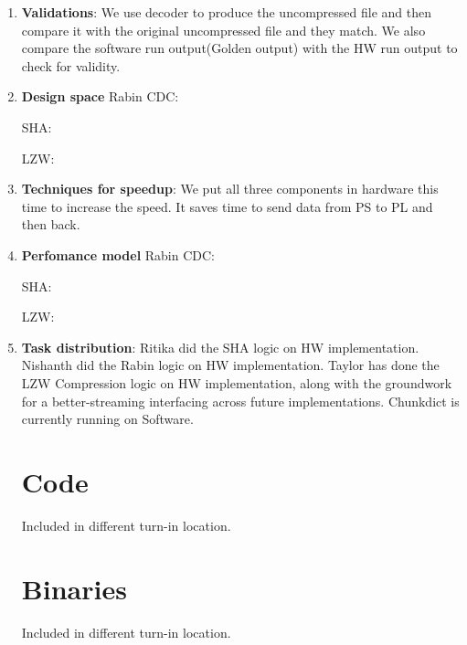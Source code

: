 \documentclass{article}
\begin{document}
\begin{enumerate}
\item%
\textbf{Validations}: We use decoder to produce the uncompressed file and then compare it with the original uncompressed file and they match. 
We also compare the software run output(Golden output) with the HW run output to check for validity. 
\newline

\item%
\textbf{Design space}\newline
Rabin CDC:\newline

SHA:\newline

LZW:\newline


\newline

\item%
\textbf{Techniques for speedup}: We put all three components in hardware this time to increase the speed. It saves time to send data from PS to PL and then back. 
\newline


\item%
\textbf{Perfomance model}
Rabin CDC:


SHA:


LZW:
\newline


\item%
\textbf{Task distribution}: 
Ritika did the SHA logic on HW implementation. 
Nishanth did the Rabin logic on HW implementation.
Taylor has done the LZW Compression logic on HW implementation, along with the groundwork for a better-streaming interfacing across future implementations.
Chunkdict is currently running on Software. 
\newline

\section{Code}

Included in different turn-in location.

\section{Binaries}

Included in different turn-in location.



\end{enumerate}
\end{document}
